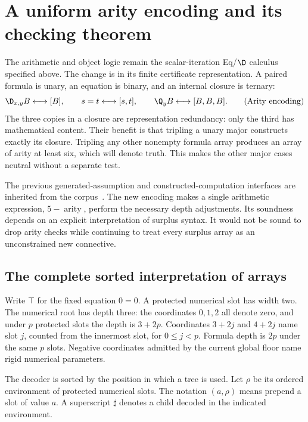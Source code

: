 \section{A uniform arity encoding and its checking theorem}
\label{sec:arity-checker}

The arithmetic and object logic remain the scalar-iteration Eq/$\D$
calculus specified above.  The change is in its finite certificate
representation.  A paired formula is unary, an equation is binary, and
an internal closure is ternary:
\[
 \D_{x,y}B\longleftrightarrow[B],\qquad
 s=t\longleftrightarrow[s,t],\qquad
 \Q_yB\longleftrightarrow[B,B,B].
 \tag{Arity encoding}\label{eq:arity-encoding}
\]
The three copies in a closure are representation redundancy: only the
third has mathematical content.  Their benefit is that tripling a unary
major constructs exactly its closure.  Tripling any other nonempty
formula array produces an array of arity at least six, which will denote
truth.  This makes the other major cases neutral without a separate
test.

The previous generated-assumption and constructed-computation interfaces
are inherited from the corpus~\cite{generated,constructed}.  The new
encoding makes a single arithmetic expression, $5-\operatorname{arity}$,
perform the necessary depth adjustments.  Its soundness depends on an
explicit interpretation of surplus syntax.  It would not be sound to
drop arity checks while continuing to treat every surplus array as an
unconstrained new connective.

\subsection{The complete sorted interpretation of arrays}
\label{subsec:sorted-arrays}

Write $\top$ for the fixed equation $0=0$.  A protected numerical slot
has width two.  The numerical root has depth three: the coordinates
$0,1,2$ all denote zero, and under $p$ protected slots the depth is
$3+2p$.  Coordinates $3+2j$ and $4+2j$ name slot $j$, counted from
the innermost slot, for $0\leq j<p$.  Formula depth is $2p$ under the
same $p$ slots.  Negative coordinates admitted by the current global
floor name rigid numerical parameters.

The decoder is sorted by the position in which a tree is used.  Let
$\rho$ be its ordered environment of protected numerical slots.
The notation $(a,\rho)$ means prepend a slot of value $a$.
A superscript $\sharp$ denotes a child decoded in the indicated
environment.

